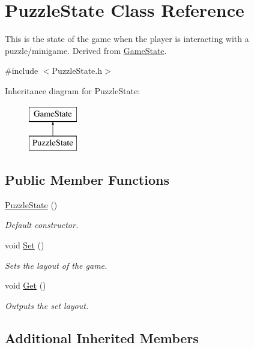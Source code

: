 \hypertarget{classPuzzleState}{\section{Puzzle\-State Class Reference}
\label{classPuzzleState}
}


This is the state of the game when the player is interacting with a puzzle/minigame. Derived from \hyperlink{classGameState}{Game\-State}.  




{\ttfamily \#include $<$Puzzle\-State.\-h$>$}

Inheritance diagram for Puzzle\-State\-:\begin{figure}[H]
\begin{center}
\leavevmode
\includegraphics[height=2.000000cm]{classPuzzleState}
\end{center}
\end{figure}
\subsection*{Public Member Functions}
\begin{DoxyCompactItemize}
\item 
\hyperlink{classPuzzleState_a441deecdaf8b7ff103933664ff476870}{Puzzle\-State} ()
\begin{DoxyCompactList}\small\item\em Default constructor. \end{DoxyCompactList}\item 
void \hyperlink{classPuzzleState_a966b0f168ff5499f247c9ab519b524ab}{Set} ()
\begin{DoxyCompactList}\small\item\em Sets the layout of the game. \end{DoxyCompactList}\item 
void \hyperlink{classPuzzleState_ac9f6dd77d6471165d9eb2c18bd051dd1}{Get} ()
\begin{DoxyCompactList}\small\item\em Outputs the set layout. \end{DoxyCompactList}\end{DoxyCompactItemize}
\subsection*{Additional Inherited Members}



